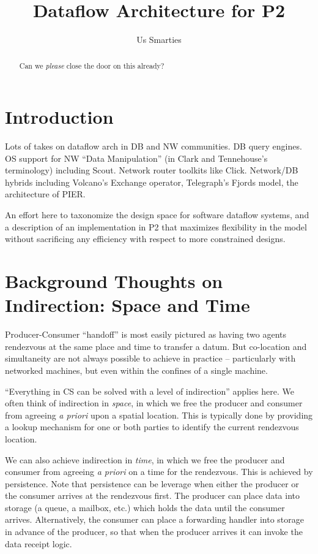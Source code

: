 \documentclass[dvips,10pt]{article}
\date{}
\title{Dataflow Architecture for P2 \vspace{-1em}}
\author{Us Smarties}
\begin{document}
\maketitle
\begin{abstract}
Can we {\em please} close the door on this already?

\end{abstract}
\section{Introduction}
Lots of takes on dataflow arch in DB and NW communities.  DB query
engines.  OS support for NW ``Data Manipulation'' (in Clark and
Tennehouse's terminology) including Scout.  Network router toolkits
like Click.  Network/DB hybrids including Volcano's Exchange operator,
Telegraph's Fjords model, the architecture of PIER.

An effort here to taxonomize the design space for software dataflow
systems, and a description of an implementation in P2 that maximizes
flexibility in the model without sacrificing any efficiency with
respect to more constrained designs.

\section{Background Thoughts on Indirection: Space and Time}
Producer-Consumer ``handoff'' is most easily pictured as having two
agents rendezvous at the same place and time to transfer a datum.  But
co-location and simultaneity are not always possible to achieve in
practice -- particularly with networked machines, but even within the
confines of a single machine.

``Everything in CS can be solved with a level of indirection'' applies
here.  We often think of indirection in {\em space}, in which we free
the producer and consumer from agreeing {\em a priori} upon a spatial
  location.  This is typically done by providing a lookup mechanism
  for one or both parties to identify the current rendezvous location.

We can also achieve indirection in {\em time}, in which we free the
producer and consumer from agreeing {\em a priori} on a time for the
rendezvous.  This is achieved by persistence.  Note that persistence
can be leverage when either the producer or the consumer arrives at
the rendezvous first. The producer can place data into storage (a
queue, a mailbox, etc.) which holds the data until the consumer
arrives.  Alternatively, the consumer can place a forwarding handler
into storage in advance of the producer, so that when the producer
arrives it can invoke the data receipt logic.
\end{document}
